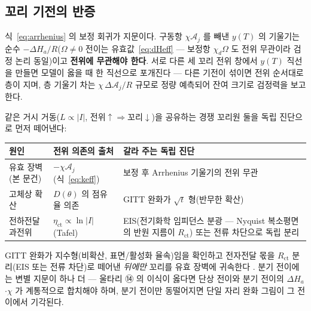 \documentclass[11pt,a4paper]{article}
\begin{document}
\subsection{꼬리 기전의 반증}
식~\eqref{eq:arrhenius} 의 보정 회귀가 지문이다. 구동항 $\chi\mathcal A_j$ 를 빼낸 $y(T)$ 의 기울기는 순수 $-\Delta H_a/R$($\Omega\ne0$ 전이는 유효값~\eqref{eq:dHeff} — 보정항 $\chi_d\Omega$ 도 전위 무관이라 검정 논리 동일)이고 \textbf{전위에 무관해야 한다}. 서로 다른 세 꼬리 전위 창에서 $y(T)$ 직선을 만들면 모델이 옳을 때 한 직선으로 포개진다 — 다른 기전이 섞이면 전위 순서대로 층이 지며, 층 기울기 차는 $\chi\,\Delta\mathcal A_j/R$ 규모로 정량 예측되어 잔여 크기로 검정력을 보고한다.

같은 거시 거동($L\propto|I|$, 전위$\uparrow\Rightarrow$꼬리$\downarrow$)을 공유하는 경쟁 꼬리원 둘을 독립 진단으로 먼저 떼어낸다:
\begin{center}
\renewcommand{\arraystretch}{1.35}
\begin{tabular}{p{} p{} p{}}
\toprule
원인 & 전위 의존의 출처 & 갈라 주는 독립 진단 \\
\midrule
유효 장벽(본 문건) & $-\chi\mathcal A_j$(식~\eqref{eq:keff}) & 보정 후 Arrhenius 기울기의 전위 무관 \\
고체상 확산 & $D(\theta)$ 의 점유율 의존 & GITT 완화가 $\sqrt t$ 형(반무한 확산) \\
전하전달 과전위 & $\eta_{\mathrm{ct}}\propto\ln|I|$(Tafel) & EIS(전기화학 임피던스 분광 — Nyquist
복소평면의 반원 지름이 $R_{\mathrm{ct}}$) 또는 전류 차단으로 독립 분리 \\
\bottomrule
\end{tabular}
\end{center}
GITT 완화가 지수형(비확산, 표면/활성화 율속)임을 확인하고 전자전달 몫을 $R_{\mathrm{ct}}$ 분리(EIS 또는 전류 차단)로 떼어낸 \emph{뒤에만} 꼬리를 유효 장벽에 귀속한다 \cite{weppner1977,bardfaulkner}. 분기 전이에는 변별 지문이 하나 더 — 울타리 ⑭ 의 이식이 옳다면 단상 전이와 분기 전이의 $\Delta H_{a}$$\cdot$$\chi$ 가 계통적으로 합치해야 하며, 분기 전이만 동떨어지면 단일 자리 완화 그림이 그 전이에서 기각된다.
\end{document}
